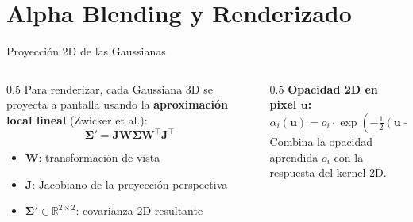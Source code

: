 \section{Alpha Blending y Renderizado}

\begin{frame}{Proyección 2D de las Gaussianas}
  \begin{columns}
    \begin{column}{0.5\textwidth}
      Para renderizar, cada Gaussiana 3D se proyecta a pantalla usando la \textbf{aproximación local lineal} (Zwicker et al.):
      \[
        \boldsymbol{\Sigma}' = \mathbf{J}\mathbf{W}\boldsymbol{\Sigma}\mathbf{W}^\top\mathbf{J}^\top
      \]
      \begin{itemize}
        \item $\mathbf{W}$: transformación de vista
        \item $\mathbf{J}$: Jacobiano de la proyección perspectiva
        \item $\boldsymbol{\Sigma}' \in \mathbb{R}^{2\times2}$: covarianza 2D resultante
      \end{itemize}
    \end{column}
    \begin{column}{0.5\textwidth}
      \textbf{Opacidad 2D en pixel $\mathbf{u}$:}
      \[
        \alpha_i(\mathbf{u}) = o_i \cdot \exp\!\left(-\tfrac{1}{2}(\mathbf{u}-\boldsymbol{\mu}'_i)^\top (\boldsymbol{\Sigma}'_i)^{-1}(\mathbf{u}-\boldsymbol{\mu}'_i)\right)
      \]
      Combina la opacidad aprendida $o_i$ con la respuesta del kernel 2D.
    \end{column}
  \end{columns}
\end{frame}

